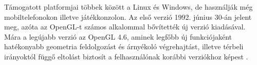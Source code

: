 Támogatott platformjai többek között a Linux és Windows, de használják még mobiltelefonokon illetve játékkonzolon.
Az első verzió 1992. június 30-án jelent meg, azóta az OpenGL-t számos alkalommal bővítették új verzió kiadásával.
Mára a legújabb verzió az OpenGL 4.6, aminek legfőbb új funkciójaként  hatékonyabb geometria feldolgozást és árnyékoló végrehajtást, illetve térbeli irányoktól függő eltolást biztosít a felhasználónak korábbi verziókhoz képest \cite{khronos1997opengl}.
